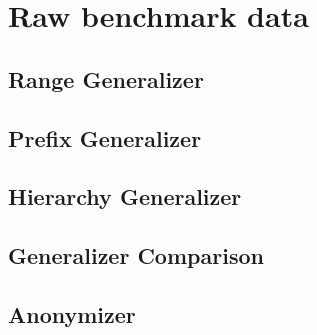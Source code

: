 \section{Raw benchmark data}

\subsection{Range Generalizer}
\vspace{\baselineskip}


\subsection{Prefix Generalizer}
\vspace{\baselineskip}


\subsection{Hierarchy Generalizer}
\vspace{\baselineskip}


\subsection{Generalizer Comparison}
\vspace{\baselineskip}


\subsection{Anonymizer}
\vspace{\baselineskip}
